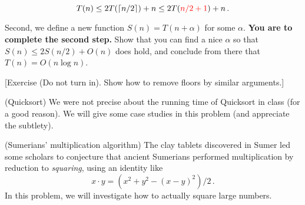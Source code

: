 \begin{questions}
  \[T(n) \le 2T(\lceil n/2 \rceil) +n \leq 2T({\color{red} n/2 + 1}) +
    n \, .\]

  Second, we define a new function $S(n) = T(n + \alpha)$ for some
  $\alpha$. \textbf{You are to complete the second step.} Show that
  you can find a nice $\alpha$ so that $S(n)\le 2S(n/2) + O(n)$ does
  hold, and conclude from there that $T(n) = O(n \log n)$. 

  [Exercise (Do not turn in). Show how to remove floors by similar
  arguments.]

  \newpage
  \question[15] (Quicksort) We were not precise about the running time
  of Quicksort in class (for a good reason). We will give some case
  studies in this problem (and appreciate the subtlety). 

  \newpage
  
\question (Sumerians' multiplication algorithm) The clay tablets
discovered in Sumer led some scholars to conjecture that ancient
Sumerians performed multiplication by reduction to \emph{squaring},
using an identity like \[x\cdot y = (x^2 + y^2 - (x - y)^2)/2 \, .\] In this
problem, we will investigate how to actually square large numbers.

\end{questions}
